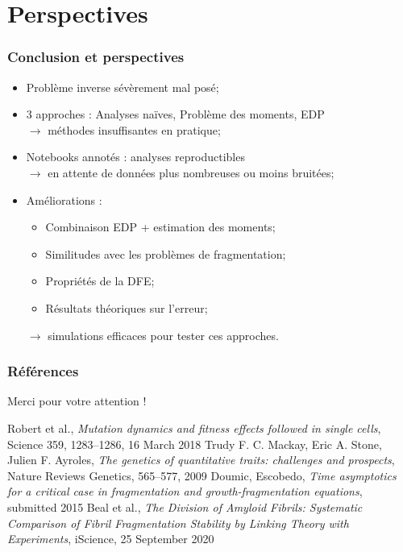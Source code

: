 \documentclass{beamer}
\begin{document}
\section*{Perspectives}

\begin{frame}
  \frametitle{Conclusion et perspectives}
  \begin{itemize}[label=$\bullet$]
    \item Problème inverse sévèrement mal posé;
    \vspace{3mm}
    \item 3 approches : Analyses naïves, Problème des moments, EDP \\
    $\to$ méthodes insuffisantes en pratique;
    \vspace{3mm}\pause
    \item Notebooks annotés : analyses reproductibles\\
    $\to$ en attente de données plus nombreuses ou moins bruitées;
    \vspace{3mm}\pause
    \item Améliorations :
    \begin{itemize}[label=$\star$]
    	\item Combinaison EDP + estimation des moments; 
	\item Similitudes avec les problèmes de fragmentation;          
	\item Propriétés de la DFE;
        \item Résultats théoriques sur l'erreur;
    \end{itemize}
    $\to$ simulations efficaces pour tester ces approches.
  \end{itemize}
\end{frame}



\begin{frame}
  \frametitle{Références}

  \begin{center}
    \Large{Merci pour votre attention !}
  \end{center}
  
\begin{thebibliography}{1}

  Robert et al.,
  \emph{Mutation dynamics and fitness effects followed in single cells}, Science 359, 1283–1286, 16 March 2018
  Trudy F. C. Mackay, Eric A. Stone, Julien F. Ayroles,
  \emph{The genetics of quantitative traits: challenges and prospects}, Nature Reviews Genetics, 565–577, 2009
  Doumic, Escobedo,
  \emph{Time asymptotics for a critical case in fragmentation and growth-fragmentation equations}, submitted 2015
  Beal et al.,
  \emph{The Division of Amyloid Fibrils: Systematic Comparison of Fibril Fragmentation Stability by Linking Theory with Experiments}, iScience, 25 September 2020
\end{thebibliography}


\end{frame}
\end{document}

